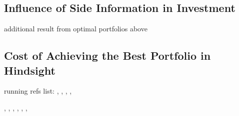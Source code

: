 \documentclass[10pt, twocolumn]{IEEEtran}
\begin{document}
\subsection{Influence of Side Information in Investment}
additional result from optimal portfolios above
\subsection{Cost of Achieving the Best Portfolio in Hindsight}





running refs list: \cite{RePEc:eee:monchp:3-04}, \cite{Burnham2011}, \cite{Cover2005}, \cite{Cover1988},

\cite{Cover1998}, \cite{Li2017}, \cite{Sims2003}, \cite{Woodford2009}, \cite{Hansen2010}, \cite{StochasticGames},

\cite{Pesaran1995}


 
\baselineskip=2pt


\end{document}
